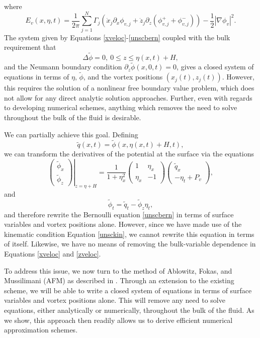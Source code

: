 \documentclass[a4paper,11pt]{article}
\newcommand{\bp}{\begin{pmatrix}}
\newcommand{\ep}{\end{pmatrix}}
\newcommand{\p}{\partial}
\begin{document}
where
\[
E_{v}(x,\eta,t) = \frac{1}{2\pi}\sum_{j=1}^{N}\Gamma_{j}\left(\dot{x}_{j}\p_{x}\phi_{v,j} + \dot{z}_{j} \p_{z}\left(\phi_{v,j}^{+} + \phi_{v,j}^{-}\right)  \right) - \frac{1}{2}\left| \nabla \phi_{v} \right|^{2}.
\]
The system given by Equations \eqref{xveloc}-\eqref{unscbern} coupled with the bulk requirement that 
\begin{equation}
\Delta \tilde{\phi} = 0, ~ 0\leq z \leq \eta(x,t)+H,
\label{harmon} 
\end{equation}
and the Neumann boundary condition $\p_{z}\tilde{\phi}(x,0,t)=0$, gives a closed system of equations in terms of $\eta$, $\tilde{\phi}$, and the vortex positions $(x_{j}(t),z_{j}(t))$.  However, this requires the solution of a nonlinear free boundary value problem, which does not allow for any direct analytic solution approaches.  Further, even with regards to developing numerical schemes, anything which removes the need to solve throughout the bulk of the fluid is desirable.    

We can partially achieve this goal.  Defining 
\[
\tilde{q}(x,t) = \tilde{\phi}(x,\eta(x,t)+H,t),
\]
we can transform the derivatives of the potential at the surface via the equations
\begin{equation}
\left.\bp\tilde{\phi}_{x}\\ \tilde{\phi}_{z}\ep\right|_{z=\eta + H} = \frac{1}{1+\eta_{x}^{2}}\bp 1 & \eta_{x}\\ \eta_{x} & -1\ep\bp\tilde{q}_{x} \\  -\eta_{t} + P_{v}\ep,
\label{phitrans}
\end{equation}
and
\begin{equation}
\tilde{\phi}_{t} = \tilde{q}_{t}-\tilde{\phi}_{z}\eta_{t},
\label{phittrans}
\end{equation}
and therefore rewrite the Bernoulli equation \eqref{unscbern} in terms of surface variables and vortex positions alone.  However, since we have made use of the kinematic condition Equation \eqref{unsckin}, we cannot rewrite this equation in terms of itself.  Likewise, we have no means of removing the bulk-variable dependence in Equations \eqref{xveloc} and \eqref{zveloc}.

To address this issue, we now turn to the method of Ablowitz, Fokas, and Mussilimani (AFM) as described in \cite{afm}.  Through an extension to the existing scheme, we will be able to write a closed system of equations in terms of surface variables and vortex positions alone.  This will remove any need to solve equations, either analytically or numerically, throughout the bulk of the fluid.  As we show, this approach then readily allows us to derive efficient numerical approximation schemes.
\end{document}
